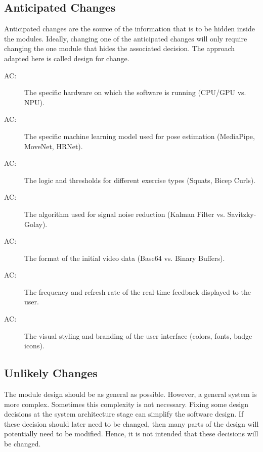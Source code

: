 \documentclass[12pt, titlepage]{article}
\newcounter{acnum}
\newcommand{\actheacnum}{AC\theacnum}
\begin{document}
\subsection{Anticipated Changes} \label{SecAchange}

Anticipated changes are the source of the information that is to be hidden
inside the modules. Ideally, changing one of the anticipated changes will only
require changing the one module that hides the associated decision. The approach
adapted here is called design for
change.

\begin{description}
\item[ \actheacnum \label{acHardware}:] The specific
  hardware on which the software is running (CPU/GPU vs. NPU).
\item[ \actheacnum \label{acMLModel}:] The specific machine learning model used for pose estimation (MediaPipe, MoveNet, HRNet).
\item[ \actheacnum \label{acExercise}:] The logic and thresholds for different exercise types (Squats, Bicep Curls).
\item[ \actheacnum \label{acSmoothing}:] The algorithm used for signal noise reduction (Kalman Filter vs. Savitzky-Golay).
\item[ \actheacnum \label{acInputFormat}:] The format of the initial video data (Base64 vs. Binary Buffers).
\item[ \actheacnum \label{acFeedbackFreq}:] The frequency and refresh rate of the real-time feedback displayed to the user.
\item[ \actheacnum \label{acUIBranding}:] The visual styling and branding of the user interface (colors, fonts, badge icons).
\end{description}


\subsection{Unlikely Changes} \label{SecUchange}

The module design should be as general as possible. However, a general system is
more complex. Sometimes this complexity is not necessary. Fixing some design
decisions at the system architecture stage can simplify the software design. If
these decision should later need to be changed, then many parts of the design
will potentially need to be modified. Hence, it is not intended that these
decisions will be changed.
\end{document}
